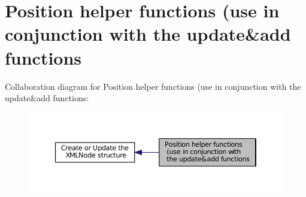 \hypertarget{group__xmlPosition}{\section{Position helper functions (use in conjunction with the update\&add functions}
\label{group__xmlPosition}
}
Collaboration diagram for Position helper functions (use in conjunction with the update\&add functions\-:
\nopagebreak
\begin{figure}[H]
\begin{center}
\leavevmode
\includegraphics[width=350pt]{group__xmlPosition}
\end{center}
\end{figure}
